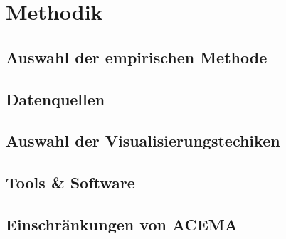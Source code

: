 \chapter{Methodik}
\label{chap:methodik}
\section{Auswahl der empirischen Methode}
\label{sec:auswahlDerEmpirischenMethode}
\section{Datenquellen}
\label{sec:datenquellen}
\section{Auswahl der Visualisierungstechiken}
\label{sec:auswahlDerVisualisierungstechniken}
\section{Tools \& Software}
\label{sec:toolsUndSoftware}
\section[Einschränkungen]{Einschränkungen von ACEMA}